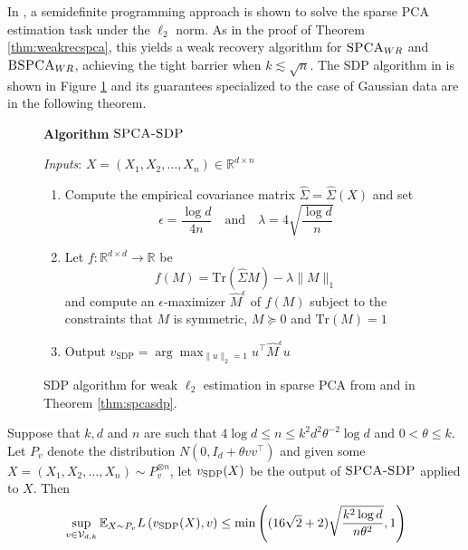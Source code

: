 In \cite{wang2016statistical}, a semidefinite programming approach is shown to solve the sparse PCA estimation task under the $\ell_2$ norm. As in the proof of Theorem \ref{thm:weakrecspca}, this yields a weak recovery algorithm for $\textsc{SPCA}_{WR}$ and $\textsc{BSPCA}_{WR}$, achieving the tight barrier when $k \lesssim \sqrt{n}$. The SDP algorithm in \cite{wang2016statistical} is shown in Figure \ref{fig:spcasdp} and its guarantees specialized to the case of Gaussian data are in the following theorem.

\begin{figure}[t!]
\begin{algbox}
\textbf{Algorithm} $\textsc{SPCA-SDP}$
\vspace{2mm}

\textit{Inputs}: $X = (X_1, X_2, \dots, X_n) \in \mathbb{R}^{d \times n}$
\begin{enumerate}
\item Compute the empirical covariance matrix $\hat{\Sigma} = \hat{\Sigma}(X)$ and set
$$\epsilon = \frac{\log d}{4n} \quad \text{and} \quad \lambda = 4 \sqrt{\frac{\log d}{n}}$$
\item Let $f : \mathbb{R}^{d \times d} \to \mathbb{R}$ be
$$f(M) = \text{Tr}\left(\hat{\Sigma} M\right) - \lambda \| M \|_1$$
and compute an $\epsilon$-maximizer $\hat{M}^{\epsilon}$ of $f(M)$ subject to the constraints that $M$ is symmetric, $M \succeq 0$ and $\text{Tr}(M) = 1$
\item Output $v_{\text{SDP}} = \arg \max_{\| u \|_2 = 1} u^\top \hat{M}^\epsilon u$
\end{enumerate}
\vspace{1mm}
\end{algbox}
\caption{SDP algorithm for weak $\ell_2$ estimation in sparse PCA from \cite{wang2016statistical} and in Theorem \ref{thm:spcasdp}.}
\label{fig:spcasdp}
\end{figure}

\begin{theorem} \label{thm:spcasdp}
Suppose that $k, d$ and $n$ are such that $4 \log d \le n \le k^2 d^2 \theta^{-2} \log d$ and $0 < \theta \le k$. Let $P_v$ denote the distribution $N(0, I_d + \theta vv^\top)$ and given some $X = (X_1, X_2, \dots, X_n) \sim P_v^{\otimes n}$, let $v_{\textnormal{SDP}}(X)$ be the output of $\textsc{SPCA-SDP}$ applied to $X$. Then
$$\sup_{v \in \mathcal{V}_{d, k}} \mathbb{E}_{X \sim P_v} L\left( v_{\textnormal{SDP}}(X), v\right) \le \min\left( (16\sqrt{2} + 2) \sqrt{\frac{k^2 \log d}{n \theta^2}}, 1 \right)$$
\end{theorem}

